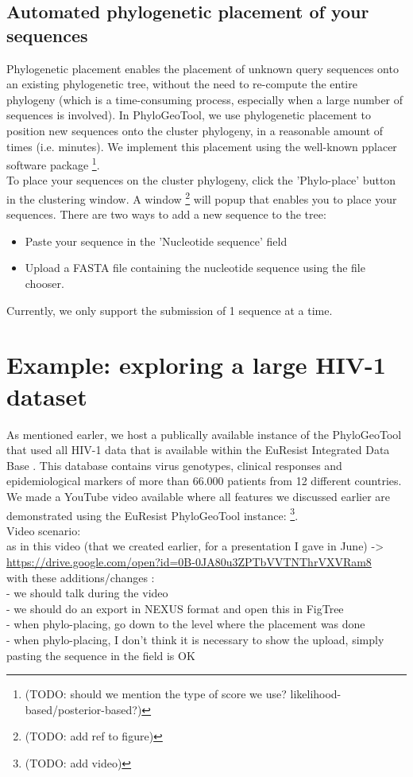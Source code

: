 \documentclass[a4paper, 11pt]{article} %
\begin{document}
\subsection{Automated phylogenetic placement of your sequences}
Phylogenetic placement enables the placement of unknown query sequences onto an existing phylogenetic tree, without the need to re-compute the entire phylogeny (which is a time-consuming process, especially when a large number of sequences is involved). In PhyloGeoTool, we use phylogenetic placement to position new sequences onto the cluster phylogeny, in a reasonable amount of times (i.e. minutes). We implement this placement using the well-known pplacer software package \cite{Matsen2010} \footnote{(TODO: should we mention the type of score we use? likelihood-based/posterior-based?)}.\\
To place your sequences on the cluster phylogeny, click the 'Phylo-place' button in the clustering window. A window \footnote{(TODO: add ref to figure)} will popup that enables you to place your sequences. There are two ways to add a new sequence to the tree:
\begin{itemize}
\item Paste your sequence in the 'Nucleotide sequence' field
\item Upload a FASTA file containing the nucleotide sequence using the file chooser.
\end{itemize}
Currently, we only support the submission of 1 sequence at a time.

\section{Example: exploring a large HIV-1 dataset}

As mentioned earler, we host a publically available instance of the PhyloGeoTool that used all HIV-1 data that is available within the EuResist Integrated Data Base \cite{Zazzi2012}. 
This database contains virus genotypes, clinical responses and epidemiological markers of more than 66.000 patients from 12 different countries.
We made a YouTube video available where all features we discussed earlier are demonstrated using the EuResist PhyloGeoTool instance: \footnote{(TODO: add video)}. \\

Video scenario:\\
 as in this video (that we created earlier, for a presentation I gave in June) -> \url{https://drive.google.com/open?id=0B-0JA80u3ZPTbVVTNThrVXVRam8} \\
 with these additions/changes :\\  
 - we should talk during the video \\
 - we should do an export in NEXUS format and open this in FigTree \\
 - when phylo-placing, go down to the level where the placement was done\\
 - when phylo-placing, I don't think it is necessary to show the upload, simply pasting the sequence in the field is OK \\



\end{document}

